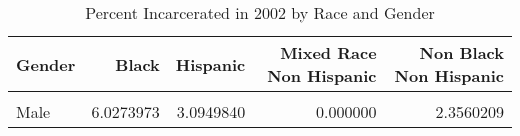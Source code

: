 \begin{table}[H]

\caption{\label{tab:tab:summarystats}Percent Incarcerated in 2002 by Race and Gender}
\centering
\begin{tabular}[t]{lrrrr}
\toprule
Gender & Black & Hispanic & Mixed Race Non Hispanic & Non Black Non Hispanic\\
\midrule
\cellcolor{gray!6}{Female} & \cellcolor{gray!6}{0.7922535} & \cellcolor{gray!6}{0.6622517} & \cellcolor{gray!6}{2.380952} & \cellcolor{gray!6}{0.5979761}\\
Male & 6.0273973 & 3.0949840 & 0.000000 & 2.3560209\\
\bottomrule
\end{tabular}
\end{table}
